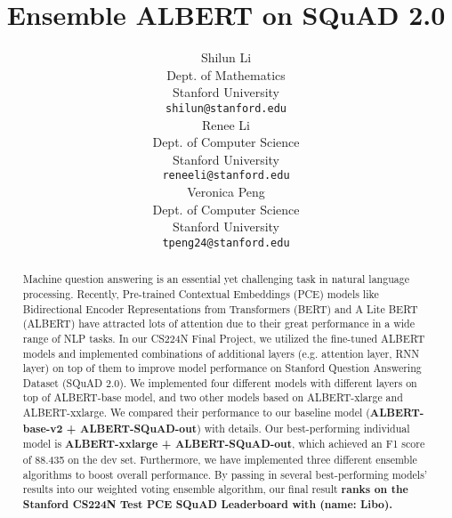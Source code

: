\documentclass{article}
\title{
 Ensemble ALBERT on SQuAD 2.0\\
}
\author{
  Shilun Li \\
  Dept. of Mathematics \\
  Stanford University \\
  \texttt{shilun@stanford.edu} \\
  \And
  Renee Li \\
  Dept. of Computer Science \\
  Stanford University \\
  \texttt{reneeli@stanford.edu}\\
  \And
  Veronica Peng \\
  Dept. of Computer Science \\
  Stanford University \\
  \texttt{tpeng24@stanford.edu}
}
\begin{document}
\maketitle
\begin{abstract}
Machine question answering is an essential yet challenging task in natural language processing. Recently, Pre-trained Contextual Embeddings (PCE) models like Bidirectional Encoder Representations from Transformers (BERT) and A Lite BERT (ALBERT) have attracted lots of attention due to their great performance in a wide range of NLP tasks. In our CS224N Final Project, we utilized the fine-tuned ALBERT models and implemented combinations of additional layers (e.g. attention layer, RNN layer) on top of them to improve model performance on Stanford Question Answering Dataset (SQuAD 2.0). We implemented four different models with different layers on top of ALBERT-base model, and two other models based on ALBERT-xlarge and ALBERT-xxlarge. We compared their performance to our baseline model (\textbf{ALBERT-base-v2 + ALBERT-SQuAD-out}) with details. Our best-performing individual model is \textbf{ALBERT-xxlarge + ALBERT-SQuAD-out}, which achieved an F1 score of 88.435 on the dev set. Furthermore, we have implemented three different ensemble algorithms to boost overall performance. By passing in several best-performing models' results into our weighted voting ensemble algorithm, our final result \textbf{ranks  on the Stanford CS224N Test PCE SQuAD Leaderboard with  (name: Libo).}

\end{abstract}
\end{document}
